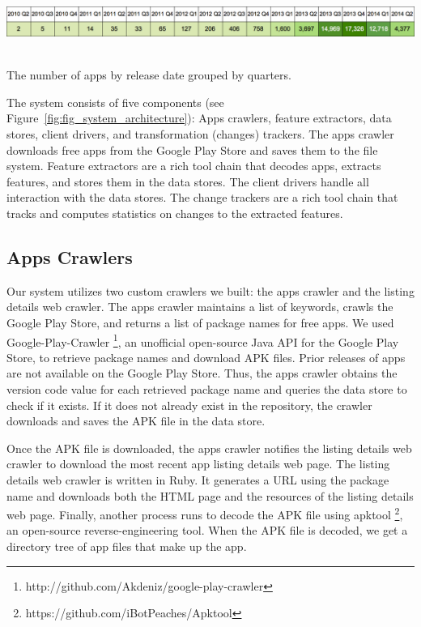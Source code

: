 \begin{table}[!t]
	\includegraphics[width=16cm, height=2cm]{figures/design-pattern-changes/release_date}
	\caption{The number of apps by release date grouped by quarters.}
	\label{tbl:release_date}
\end{table}

\par The system consists of five components (see Figure~\ref{fig:fig_system_architecture}): Apps crawlers, feature extractors, data stores, client drivers, and transformation (changes) trackers.
The apps crawler downloads free apps from the Google Play Store and saves them to the file system.
Feature extractors are a rich tool chain that decodes apps, extracts features, and stores them in the data stores.
The client drivers handle all interaction with the data stores.
The change trackers are a rich tool chain that tracks and computes statistics on changes to the extracted features.

\subsection{Apps Crawlers}
Our system utilizes two custom crawlers we built: the apps crawler and the listing details web crawler.
The apps crawler maintains a list of keywords, crawls the Google Play Store, and returns a list of package names for free apps.
We used Google-Play-Crawler \footnote{http://github.com/Akdeniz/google-play-crawler}, an unofficial open-source Java API for the Google Play Store, to retrieve package names and download APK files.
Prior releases of apps are not available on the Google Play Store.
Thus, the apps crawler obtains the version code value for each retrieved package name and queries the data store to check if it exists.
If it does not already exist in the repository, the crawler downloads and saves the APK file in the data store.

\par Once the APK file is downloaded, the apps crawler notifies the listing details web crawler to download the most recent app listing details web page.
The listing details web crawler is written in Ruby.
It generates a URL using the package name and downloads both the HTML page and the resources of the listing details web page.
Finally, another process runs to decode the APK file using apktool \footnote{https://github.com/iBotPeaches/Apktool}, an open-source reverse-engineering tool.
When the APK file is decoded, we get a directory tree of app files that make up the app.

